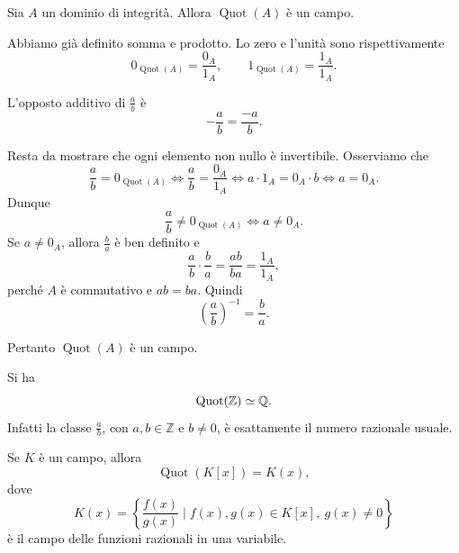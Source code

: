 \documentclass[a4paper]{article}
\begin{document}
\begin{radioactive}
\begin{snippetproposition}{}
    Sia \(A\) un dominio di integrità. Allora \(\operatorname{Quot}(A)\) è un campo.
\end{snippetproposition}
\end{radioactive}

\begin{radioactive}
\begin{snippetproof}{}
    Abbiamo già definito somma e prodotto. Lo zero e l'unità sono rispettivamente
    \[
        0_{\operatorname{Quot}(A)}
        =
        \frac{0_A}{1_A},
        \qquad
        1_{\operatorname{Quot}(A)}
        =
        \frac{1_A}{1_A}.
    \]

    L'opposto additivo di \(\frac{a}{b}\) è
    \[
        -\frac{a}{b}
        =
        \frac{-a}{b}.
    \]

    Resta da mostrare che ogni elemento non nullo è invertibile.
    Osserviamo che
    \[
        \frac{a}{b}=0_{\operatorname{Quot}(A)}
        \iff
        \frac{a}{b}=\frac{0_A}{1_A}
        \iff
        a\cdot 1_A=0_A\cdot b
        \iff
        a=0_A.
    \]
    Dunque
    \[
        \frac{a}{b}\neq 0_{\operatorname{Quot}(A)}
        \iff
        a\neq 0_A.
    \]
    Se \(a\neq 0_A\), allora \(\frac{b}{a}\) è ben definito e
    \[
        \frac{a}{b}\cdot \frac{b}{a}
        =
        \frac{ab}{ba}
        =
        \frac{1_A}{1_A},
    \]
    perché \(A\) è commutativo e \(ab=ba\).
    Quindi
    \[
        \left(\frac{a}{b}\right)^{-1}
        =
        \frac{b}{a}.
    \]

    Pertanto \(\operatorname{Quot}(A)\) è un campo.
\end{snippetproof}
\end{radioactive}

\begin{radioactive}
\begin{snippetexample}{}
    Si ha
    \[
        \operatorname{Quot}(\mathbb{Z})
        \simeq
        \mathbb{Q}.
    \]
    Infatti la classe \(\frac{a}{b}\), con \(a,b\in \mathbb{Z}\) e \(b\neq 0\), è esattamente il numero razionale usuale.
\end{snippetexample}
\end{radioactive}

\begin{radioactive}
\begin{snippetexample}{}
    Se \(K\) è un campo, allora
    \[
        \operatorname{Quot}(K[x])
        =
        K(x),
    \]
    dove
    \[
        K(x)
        =
        \left\{
            \frac{f(x)}{g(x)}
            \mid
            f(x),g(x)\in K[x],
            \ g(x)\neq 0
        \right\}
    \]
    è il campo delle funzioni razionali in una variabile.
\end{snippetexample}
\end{radioactive}
\end{document}
